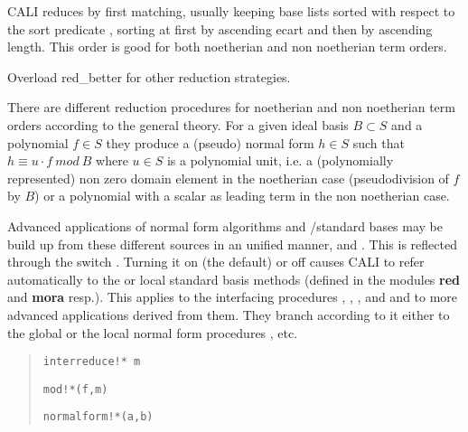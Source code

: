 CALI reduces by first matching, usually keeping base lists sorted
with respect to the sort predicate , sorting at
first by ascending ecart and then by ascending length. This order is
good for both noetherian and non noetherian term orders.

Overload red\_better for other reduction strategies.
\medskip

There are different reduction procedures for noetherian and non
noetherian term orders according to the general theory. For a given
ideal basis $B\subset S$ and a polynomial $f\in S$ they produce a
(pseudo) normal form $h\in S$ such that $h\equiv u\cdot f\ mod\ B$
where $u\in S$ is a polynomial unit, i.e. a (polynomially
represented) non zero domain element in the noetherian case
(pseudodivision of $f$ by $B$) or a polynomial with a scalar as
leading term in the non noetherian case. 

Advanced applications of normal form algorithms and \gr /standard
bases may be build up from these different sources in an unified
manner, \cite{Gr23} and \cite{ala}. This is reflected through the
switch .  Turning it on (the default) or off causes
CALI to refer automatically to the \gr or local standard basis
methods (defined in the modules {\bf red} and {\bf mora} resp.).
This applies to the interfacing procedures ,
, ,  and 
and to more advanced applications derived from them. They branch
according to it either to the global or the local normal form
procedures ,  etc.

\begin{quote}
\verb|interreduce!* m|


\verb|mod!*(f,m)|


\verb|normalform!*(a,b)|


\end{quote}

